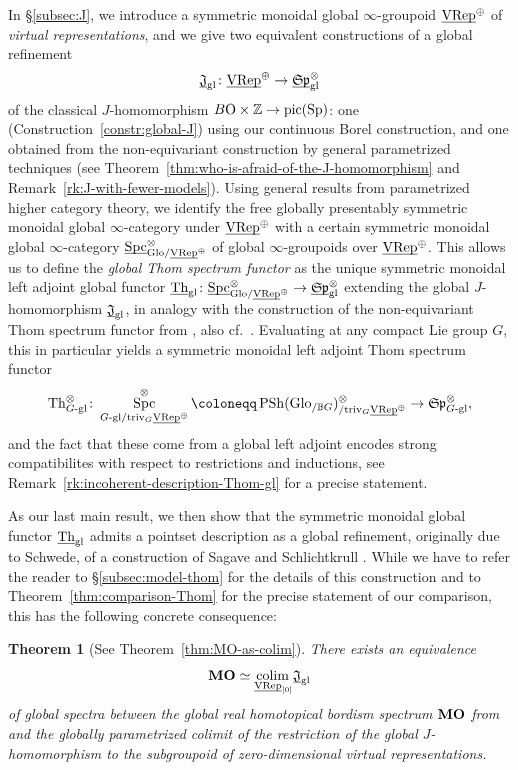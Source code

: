 \documentclass[reqno]{memo-l}
\theoremstyle{mythm}
\newtheorem{introthm}{Theorem}
\theoremstyle{definition}
\numberwithin{equation}{section}
\newcommand{\Z} {{\mathbb{Z}}}
\newcommand{\gl}{\textup{gl}}
\DeclareMathOperator{\Sp}{Sp}
\DeclareMathOperator{\Spc}{Spc}
\DeclareMathOperator{\PSh}{PSh}
\newcommand{\cat}[1]{\textbf{\textup{#1}}}
\newcommand{\triv}{{\textup{triv}}}
\renewcommand{\O}{{\textup{O}}}
\newcommand{\colim}{\mathop{\textup{colim}}}
\newcommand{\Glo}{\textup{Glo}}
\newcommand{\BGcat}[1]{\mathbb B{#1}}
\newcommand{\ulhelper}[2]{\underline{\setbox0=\hbox{$#1#2$}\dp0=0.4pt \box0\relax}}
\newcommand{\ul}[1]{{\mathpalette\ulhelper{#1}}\hbox{\rule[-2pt]{0pt}{0pt}}}
\newcommand{\mySp}{{\mathfrak S\kern-.5pt\mathfrak p}}
\newcommand{\Th}{{\textup{Th}}}
\newcommand{\pic}{\textup{pic}}
\newcommand{\VRep}{\textup{VRep}}
\begin{document}
In §\ref{subsec:J}, we introduce a symmetric monoidal global $\infty$-groupoid $\ul\VRep^\oplus$ of \emph{virtual representations}, and we give two equivalent constructions of a global refinement 
\[
    \ul{\mathfrak J}_\gl\colon\ul\VRep^\oplus\to\ul\mySp_\gl^\otimes
\]
of the classical $J$-homomorphism $B\O\times\Z\to\pic(\Sp)$: one (Construction~\ref{constr:global-J}) using our continuous Borel construction, and one obtained from the non-equivariant construction by general parametrized techniques (see Theorem~\ref{thm:who-is-afraid-of-the-J-homomorphism} and Remark~\ref{rk:J-with-fewer-models}).
Using general results from parametrized higher category theory, we identify the free globally presentably symmetric monoidal global $\infty$-category under $\ul\VRep^\oplus$ with a certain symmetric monoidal global $\infty$-category $\smash{\ul\Spc_{\Glo/\ul\VRep^\oplus}^\otimes}\vphantom{g_g^\otimes}$ of global $\infty$-groupoids over $\ul\VRep^\oplus$. This allows us to define the \emph{global Thom spectrum functor} as the unique symmetric monoidal left adjoint global functor $\smash{\ul\Th_\gl\colon\ul\Spc_{\Glo/\ul\VRep^\oplus}^\otimes}\to\ul\mySp_\gl^\otimes$ extending the global $J$-homomorphism $\ul{\mathfrak J}_\gl$, in analogy with the construction of the non-equivariant Thom spectrum functor from \cite{thom-oo}, also cf.~\cite{horev-klang-zou}. Evaluating at any compact Lie group $G$, this in particular yields a symmetric monoidal left adjoint Thom spectrum functor 
\[     \Th_\text{$G$-gl}^\otimes\colon\Spc_{\text{$G$-gl}/\triv_G\ul\VRep^{\oplus}}^\otimes\coloneqq\PSh(\Glo_{/\BGcat{G}})_{/\triv_G\ul\VRep^{\oplus}}^\otimes\to\mySp_\text{$G$-gl}^\otimes,\] 
and the fact that these come from a global left adjoint encodes strong compatibilites with respect to restrictions and inductions, see Remark~\ref{rk:incoherent-description-Thom-gl} for a precise statement. 

As our last main result, we then show that the symmetric monoidal global functor $\ul\Th_\gl$ admits a pointset description as a global refinement, originally due to Schwede, of a construction of Sagave and Schlichtkrull \cite{sagave-schlichtkrull-thom}. While we have to refer the reader to §\ref{subsec:model-thom} for the details of this construction and to Theorem~\ref{thm:comparison-Thom} for the precise statement of our comparison, this has the following concrete consequence:

\begin{introthm}[See Theorem~\ref{thm:MO-as-colim}]\label{introthm:mo-as-colim}
    There exists an equivalence
    \[
        \cat{MO}\simeq\colim_{\ul\VRep_{[0]}\!}\ul{\mathfrak J}_\gl
    \]
    of global spectra between the global real homotopical bordism spectrum $\cat{MO}$ from \cite{schwede2018global} and the globally parametrized colimit of the restriction of the global $J$-homomorphism to the subgroupoid of zero-dimensional virtual representations.
\end{introthm}
\end{document}
